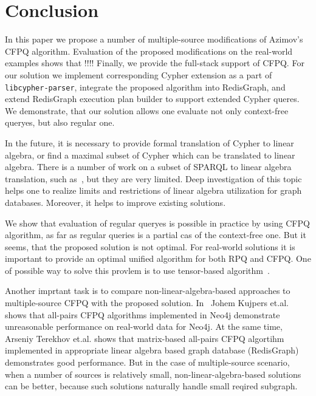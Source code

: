 \section{Conclusion}

In this paper we propose a number of multiple-source modifications of Azimov's CFPQ algorithm.
Evaluation of the proposed modifications on the real-world examples shows that !!!!
Finally, we provide the full-stack support of CFPQ.
For our solution we implement corresponding Cypher extension as a part of \texttt{libcypher-parser}, integrate the proposed algorithm into RedisGraph, and extend RedisGraph execution plan builder to support extended Cypher queres.
We demonstrate, that our solution allows one evaluate not only context-free queryes, but also regular one.

In the future, it is necessary to provide formal translation of Cypher to linear algebra, or find a maximal subset of Cypher which can be translated to linear algebra.
There is a number of work on a subset of SPARQL to linear algebra translation, such as~\cite{!!!}, but they are very limited. 
Deep investigation of this topic helps one to realize limits and restrictions of linear algebra utilization for graph databases.
Moreover, it helps to improve existing solutions.

We show that evaluation of regular queryes is possible in practice by using CFPQ algorithm, as far as regular queries is a partial cas of the context-free one.
But it seems, that the proposed solution is not optimal. 
For real-world solutions it is important to provide an optimal unified algorithm for both RPQ and CFPQ.
One of possible way to solve this provlem is to use tensor-based algorithm~\cite{!!!}.

Another imprtant task is to compare non-linear-algebra-based approaches to multiple-source CFPQ with the proposed solution. 
In~\cite{!!!} Johem Kujpers et.al. shows that all-pairs CFPQ algorithms implemented in Neo4j demonstrate unreasonable performance on real-world data for Neo4j.
At the same time, Arseniy Terekhov et.al. shows that matrix-based all-pairs CFPQ algortihm implemented in appropriate linear algebra based graph database (RedisGraph) demonstrates good performance.
But in the case of multiple-source scenario, when a number of sources is relatively small, non-linear-algebra-based solutions can be better, because such solutions naturally handle small reqired subgraph.